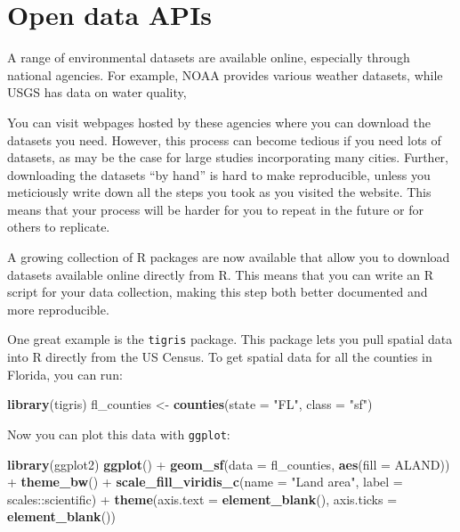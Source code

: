 \documentclass[]{tufte-book}
\newenvironment{Shaded}{}{}
\newcommand{\DataTypeTok}[1]{\textcolor[rgb]{0.56,0.13,0.00}{#1}}
\newcommand{\KeywordTok}[1]{\textcolor[rgb]{0.00,0.44,0.13}{\textbf{#1}}}
\newcommand{\NormalTok}[1]{#1}
\newcommand{\OperatorTok}[1]{\textcolor[rgb]{0.40,0.40,0.40}{#1}}
\newcommand{\StringTok}[1]{\textcolor[rgb]{0.25,0.44,0.63}{#1}}
\begin{document}
\hypertarget{open-data-apis}{%
\section{Open data APIs}\label{open-data-apis}}

A range of environmental datasets are available online, especially through national agencies.
For example, NOAA provides various weather datasets, while USGS has data on water quality,

You can visit webpages hosted by these agencies where you can download the datasets you need.
However, this process can become tedious if you need lots of datasets, as may be the case for
large studies incorporating many cities. Further, downloading the datasets ``by hand'' is hard
to make reproducible, unless you meticiously write down all the steps you took as you visited
the website. This means that your process will be harder for you to repeat in the future
or for others to replicate.

A growing collection of R packages are now available that allow you to download datasets
available online directly from R. This means that you can write an R script for your data
collection, making this step both better documented and more reproducible.

One great example is the \texttt{tigris} package. This package lets you pull
spatial data into R directly from the US Census. To get spatial data for all the counties in
Florida, you can run:

\begin{Shaded}
\begin{Highlighting}[]
\KeywordTok{library}\NormalTok{(tigris)}
\NormalTok{fl_counties <-}\StringTok{ }\KeywordTok{counties}\NormalTok{(}\DataTypeTok{state =} \StringTok{"FL"}\NormalTok{, }\DataTypeTok{class =} \StringTok{"sf"}\NormalTok{)}
\end{Highlighting}
\end{Shaded}

Now you can plot this data with \texttt{ggplot}:

\begin{Shaded}
\begin{Highlighting}[]
\KeywordTok{library}\NormalTok{(ggplot2)}
\KeywordTok{ggplot}\NormalTok{() }\OperatorTok{+}\StringTok{ }\KeywordTok{geom_sf}\NormalTok{(}\DataTypeTok{data =}\NormalTok{ fl_counties, }\KeywordTok{aes}\NormalTok{(}\DataTypeTok{fill =}\NormalTok{ ALAND)) }\OperatorTok{+}\StringTok{ }
\StringTok{    }\KeywordTok{theme_bw}\NormalTok{() }\OperatorTok{+}\StringTok{ }\KeywordTok{scale_fill_viridis_c}\NormalTok{(}\DataTypeTok{name =} \StringTok{"Land area"}\NormalTok{, }
    \DataTypeTok{label =}\NormalTok{ scales}\OperatorTok{::}\NormalTok{scientific) }\OperatorTok{+}\StringTok{ }\KeywordTok{theme}\NormalTok{(}\DataTypeTok{axis.text =} \KeywordTok{element_blank}\NormalTok{(), }
    \DataTypeTok{axis.ticks =} \KeywordTok{element_blank}\NormalTok{())}
\end{Highlighting}
\end{Shaded}
\end{document}
